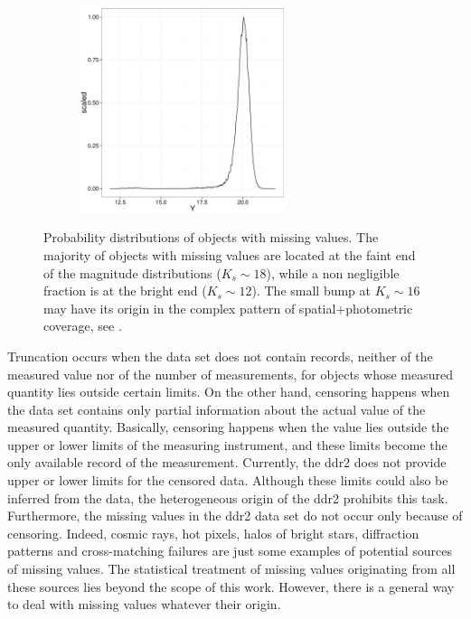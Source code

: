 \begin{figure}[ht!]
\begin{subfigure}[t]{0.45\textwidth}
    \end{subfigure}
     \begin{subfigure}[t]{0.45\textwidth}
      \includegraphics[page=4,height=6cm]{background/Figures/MissingDistribution.pdf}
        \caption{}
         
    \end{subfigure}
\caption{Probability distributions of objects with missing values. The majority of objects with missing values are located at the faint end of the magnitude distributions ($K_s \sim 18$), while a non negligible fraction is at the bright end ($K_s \sim 12$). The small bump at $K_s \sim 16$ may have its origin in the complex pattern of spatial+photometric coverage, see \citet{Bouy2013}.}
\label{fig:NAsKs}
\end{figure}




{Truncation occurs when the data set does not contain records, neither of the measured value nor of the number of measurements, for objects whose measured quantity lies outside certain limits}. On the other hand, censoring happens when the data set contains only partial information about the actual value of the measured quantity. Basically,  censoring happens when the value lies outside the upper or lower limits of the measuring instrument, and these limits become the only available record of the measurement. Currently, the \gls{ddr2} does not provide upper or lower limits for the censored data. Although these limits could also be inferred from the data, the heterogeneous origin of the \gls{ddr2} prohibits this task. Furthermore, the missing values in the \gls{ddr2} data set do not occur only because of censoring. Indeed, cosmic rays, hot pixels, halos of bright stars, diffraction patterns and cross-matching failures are just some examples of potential sources of missing values. The statistical treatment of missing values originating from all these sources lies beyond the scope of this work. However, there is a general way to deal with missing values {whatever} their origin.

